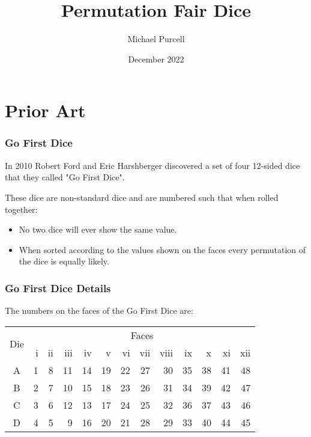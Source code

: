 \documentclass[aspectratio=169]{beamer}
\title{Permutation Fair Dice}
\author{Michael Purcell}
\date{December 2022}
\begin{document}
\small
\begin{frame}[Triangle=siiorange]
\titlepage
\end{frame}

\section{Prior Art}
\begin{frame}[Triangle=siiorange]
	\tocpage
\end{frame}

\begin{frame}[triangle=siiblue]
\frametitle{Go First Dice}
In 2010 Robert Ford and Eric Harshberger discovered a set of four 12-sided dice that they called "Go First Dice".

\vfill

These dice are non-standard dice and are numbered such that when rolled together:
\begin{itemize}
	\item No two dice will ever show the same value.
	\item When sorted according to the values shown on the faces every permutation of the dice is equally likely.
\end{itemize}
\end{frame}

\begin{frame}[triangle=siiblue]
\frametitle{Go First Dice Details}
The numbers on the faces of the Go First Dice are:
{
\footnotesize
\begin{table}
\begin{tabular}{c rrrrrrrrrrrr} \toprule
\multirow{2}[2]{*}{Die} &  \multicolumn{12}{c}{Faces} \\ \cmidrule(lr){2-13}     
   & i & ii & iii & iv & v & vi & vii & viii & ix & x & xi & xii \\ \midrule
A & 1 & 8 & 11 & 14 & 19 & 22 & 27 & 30 & 35 & 38 & 41 & 48 \\
B & 2 & 7 & 10 & 15 & 18 & 23 & 26 & 31 & 34 & 39 & 42 & 47 \\
C & 3 & 6 & 12 & 13 & 17 & 24 & 25 & 32 & 36 & 37 & 43 & 46 \\
D & 4 & 5 & 9 & 16 & 20 & 21 & 28 & 29 & 33 & 40 & 44 & 45 \\ \bottomrule
\end{tabular}
\end{table}
}
\end{frame}
\end{document}
